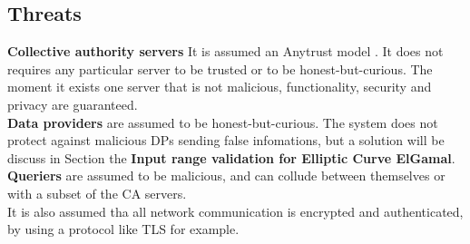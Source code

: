 \documentclass{article}
\begin{document}
\subsection{Threats}
\textbf{Collective authority servers} It is assumed an Anytrust model \cite{anytrust}. It does not requires any particular server to be trusted or to be honest-but-curious. The moment it exists one server that is not malicious, functionality, security and privacy are guaranteed.\\
\textbf{Data providers} are assumed to be honest-but-curious. The system does not protect against malicious DPs sending false infomations, but a solution will be discuss  in Section the \textbf{Input range validation for Elliptic Curve ElGamal}.\\
\textbf{Queriers} are assumed to be malicious, and can collude between themselves or with a subset of the CA servers.\\
It is also assumed tha all network communication is encrypted and authenticated, by using a protocol like TLS for example.
\end{document}
